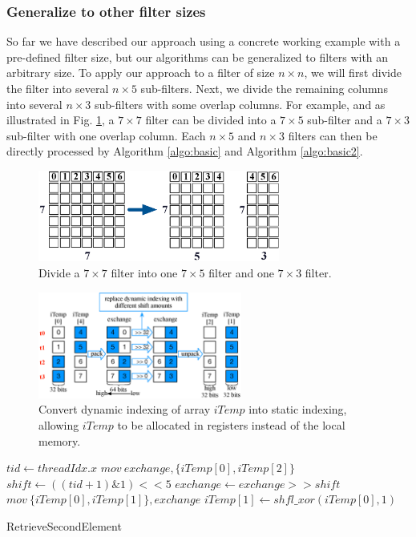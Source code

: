 \subsubsection{Generalize to other filter sizes} So far we have described our approach using a concrete working example with a pre-defined
filter size, but our algorithms can be generalized to filters with an arbitrary size. To apply our approach to a filter of size $n \times
n$, we will first divide the filter into several $n \times 5$ sub-filters. Next, we divide the remaining columns into several $n \times 3$
sub-filters with some overlap columns. For example, and as illustrated in Fig. \ref{fig:split7x7}, a $7 \times 7$ filter can be divided into
a $7 \times 5$ sub-filter and a $7 \times 3$ sub-filter with one overlap column. Each $n \times 5$ and $n \times 3$ filters can then be
directly processed by Algorithm \ref{algo:basic} and Algorithm \ref{algo:basic2}.
\begin{figure}[t!]
\centering
  \includegraphics[height=3cm]{./figure/split7x7.eps}
  \vspace{-3mm}
  \caption{Divide a $7 \times 7$ filter into one $7 \times 5$ filter and one $7 \times 3$ filter.}
  \label{fig:split7x7}
\end{figure}

\begin{figure}[t!]
	\centering
	\includegraphics[width=0.8\columnwidth,height=3.5cm]{./figure/exchange.eps}
	\vspace{-3mm}
\caption{Convert dynamic indexing of array $iTemp$ into static indexing, allowing  $iTemp$ to be allocated in registers instead of the local memory.}
\label{fig:exchange}
\end{figure}

\begin{algorithm}[t!]
\small
	$tid \gets threadIdx.x$\;
	$mov\ exchange, \{iTemp[0], iTemp[2]\}$\;
	$shift \gets ((tid+1)\&1)<<5$\;
	$exchange \gets exchange >> shift$\;
	$mov\ \{iTemp[0],iTemp[1]\}, exchange$\;
	$iTemp[1] \gets shfl\_xor(iTemp[0],1)$\;	
	\caption{RetrieveSecondElement}
	\label{algo:basic2}
\end{algorithm}


